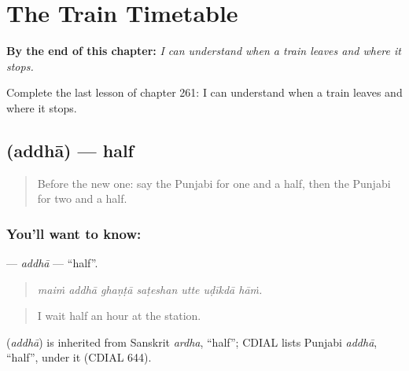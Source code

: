 
\chapter{The Train Timetable}
\label{ch:pa-a2-the-train-timetable}

\begin{chapteropening}
\textbf{By the end of this chapter:} \emph{I can understand when a train leaves and where it stops.}

Complete the last lesson of chapter 261: I can understand when a train leaves and where it stops.
\end{chapteropening}

\section[\texorpdfstring{\pa{ਅੱਧਾ} (addhā)}{ਅੱਧਾ (addhā)}]{ (addhā) — half}

\label{lesson:PA-C261-addha}



\begin{quote}
Before the new one: say the Punjabi for one and a half, then the Punjabi for two and a half.
\end{quote}

\subsection*{You'll want to know: }
\textbf{} — \emph{addhā} — \textquotedblleft{}half\textquotedblright{}.

\begin{quote}
      
\end{quote}

\begin{quote}
\emph{maiṁ addhā ghaṇṭā saṭeshan utte uḍīkdā hāṁ.}
\end{quote}

\begin{quote}
I wait half an hour at the station.
\end{quote}

\begin{cousinweb}
\textbf{} (\emph{addhā}) is inherited from Sanskrit \emph{ardha}, \textquotedblleft{}half\textquotedblright{}; CDIAL lists Punjabi \emph{addhā}, \textquotedblleft{}half\textquotedblright{}, under it (CDIAL 644).
\end{cousinweb}

